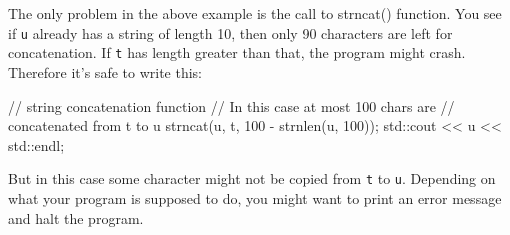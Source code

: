 The only problem in the above example is the call to strncat() function. You see if \texttt{u} already has a string of length 10, then only 90 characters are left for concatenation. If \texttt{t} has length greater than that, the program might crash. Therefore it's safe to write this:

\begin{consolethree}[escapeinside=||]
// string concatenation function
// In this case at most 100 chars are
// concatenated from t to u
strncat(u, t, 100 - strnlen(u, 100));
std::cout << u << std::endl;
\end{consolethree}

But in this case some character might not be copied from \texttt{t} to \texttt{u}. Depending on what your program is supposed to do, you might want to print an error message and halt the program.


